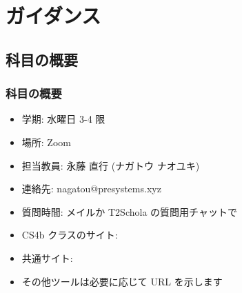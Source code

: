 \section{ガイダンス}
%
%
\subsection{科目の概要}
\begin{frame}
\frametitle{科目の概要}
  \begin{itemize}
\item 学期: 水曜日 3-4 限
\item 場所: Zoom
\item 担当教員: 永藤 直行 (ナガトウ ナオユキ)
\item 連絡先: nagatou@presystems.xyz
\item 質問時間: メイルか T2Schola の質問用チャットで
\item CS4b クラスのサイト: \href{https://sites.google.com/presystems.xyz/elementarycs/top}{} 
\item 共通サイト: \href{https://wakita.github.io/classes/y21/cs1/course.html}{}
\item その他ツールは必要に応じて URL を示します
  \end{itemize}
\end{frame}
%
%

